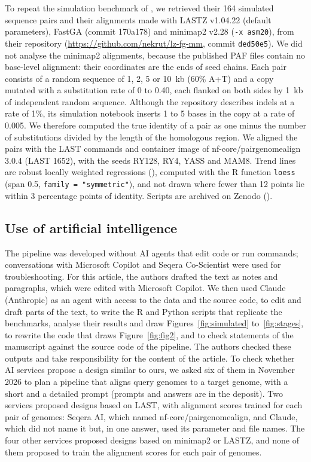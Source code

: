 \documentclass[PCJ,Unicode,screen]{cedram}
\begin{document}
To repeat the simulation benchmark of \citet{Gulhan_2025}, we retrieved their 164 simulated sequence pairs and their alignments made with LASTZ v1.04.22 (default parameters), FastGA (commit 170a178) and minimap2 v2.28 (\texttt{-x asm20}), from their repository (\url{https://github.com/nekrut/lz-fg-mm}, commit \texttt{ded50e5}). We did not analyse the minimap2 alignments, because the published PAF files contain no base-level alignment: their coordinates are the ends of seed chains. Each pair consists of a random sequence of 1, 2, 5 or 10~kb (60\% A+T) and a copy mutated with a substitution rate of 0 to 0.40, each flanked on both sides by 1~kb of independent random sequence. Although the repository describes indels at a rate of 1\%, its simulation notebook inserts 1 to 5 bases in the copy at a rate of 0.005. We therefore computed the true identity of a pair as one minus the number of substitutions divided by the length of the homologous region. We aligned the pairs with the LAST commands and container image of nf-core/pairgenomealign 3.0.4 (LAST 1652), with the seeds RY128, RY4, YASS and MAM8. Trend lines are robust locally weighted regressions (\cite{Cleveland_1979}), computed with the R function \texttt{loess} (span 0.5, \texttt{family = "symmetric"}), and not drawn where fewer than 12 points lie within 3 percentage points of identity. Scripts are archived on Zenodo (\cite{pairgenomealign_paper_data}).

\subsection*{Use of artificial intelligence}

The pipeline was developed without AI agents that edit code or run commands; conversations with Microsoft Copilot and Seqera Co-Scientist were used for troubleshooting. For this article, the authors drafted the text as notes and paragraphs, which were edited with Microsoft Copilot. We then used Claude (Anthropic) as an agent with access to the data and the source code, to edit and draft parts of the text, to write the R and Python scripts that replicate the benchmarks, analyse their results and draw Figures~\ref{fig:simulated} to~\ref{fig:stages}, to rewrite the code that draws Figure~\ref{fig:fig2}, and to check statements of the manuscript against the source code of the pipeline. The authors checked these outputs and take responsibility for the content of the article. To check whether AI services propose a design similar to ours, we asked six of them in November 2026 to plan a pipeline that aligns query genomes to a target genome, with a short and a detailed prompt (prompts and answers are in the deposit). Two services proposed designs based on LAST, with alignment scores trained for each pair of genomes: Seqera AI, which named nf-core/pairgenomealign, and Claude, which did not name it but, in one answer, used its parameter and file names. The four other services proposed designs based on minimap2 or LASTZ, and none of them proposed to train the alignment scores for each pair of genomes.
\end{document}
